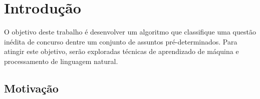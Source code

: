 %
%
% 
%

\chapter{Introdução}
\noindent
O objetivo deste trabalho é desenvolver um algoritmo que classifique uma questão inédita de concurso dentre um conjunto de assuntos pré-determinados. Para atingir este objetivo, serão exploradas técnicas de aprendizado de máquina e processamento de linguagem natural.


\section{Motivação}

